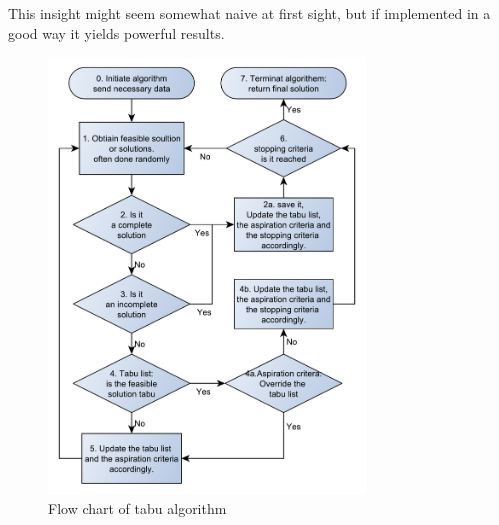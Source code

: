 This insight might seem somewhat naive at first sight, but if implemented in a good way it yields powerful results.
\begin{figure}[!h]
	\centering
	\includegraphics[width=0.75\textwidth,height=0.70\textheight]{chapter_4_methods/ny_generel}
  	\caption[Generic flow chart of tabu algorithm]
  	{Flow chart of tabu algorithm}
	\label{t1}
\end{figure}

